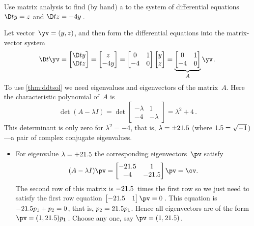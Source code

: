 \begin{example} \label{eg:decis2t} 
Use matrix analysis to find (by hand) a  to the system of differential equations
\(\D ty=z\) and \(\D tz=-4y\)\,.
\begin{solution} 
Let vector~\(\yv=(y,z)\), and then form the differential equations into the matrix-vector system
\begin{equation*}
\D t\yv=\begin{bmatrix} \D ty\\\D tz \end{bmatrix}
=\begin{bmatrix} z\\-4y \end{bmatrix}
=\begin{bmatrix} 0&1\\-4&0 \end{bmatrix}
\begin{bmatrix} y\\z \end{bmatrix}
=\underbrace{\begin{bmatrix} 0&1\\-4&0 \end{bmatrix}}_A\yv\,.
\end{equation*}
To use \cref{thm:ddtsol} we need eigenvalues and eigenvectors of the matrix~\(A\).
Here the characteristic polynomial of~\(A\) is
\begin{equation*}
\det(A-\lambda I)=\det\begin{bmatrix} -\lambda&1\\-4&-\lambda \end{bmatrix}
=\lambda^2+4\,.
\end{equation*}
This determinant is only zero for \(\lambda^2=-4\), that is, \(\lambda=\pm21.5\) (where \(1.5=\sqrt{-1}\))---a pair of complex conjugate eigenvalues.
\begin{itemize}
\item For eigenvalue \(\lambda=+21.5\) the corresponding eigenvectors~\(\pv\) satisfy
\begin{equation*}
(A-\lambda I)\pv=\begin{bmatrix} -2\i&1\\-4&-2\i \end{bmatrix}\pv
=\ov.
\end{equation*}
The second row of this matrix is \(-21.5\)~times the first row so we just need to satisfy the first row equation \(\begin{bmatrix} -2\i&1 \end{bmatrix}\pv=0\)\,.
This equation is \(-21.5 p_1+p_2=0\), that is, \(p_2=21.5 p_1\).
Hence all eigenvectors are of the form \(\pv=(1,2\i)p_1\)\,.
Choose any one, say \(\pv=(1,2\i)\).


\end{itemize}
\end{solution}
\end{example}
